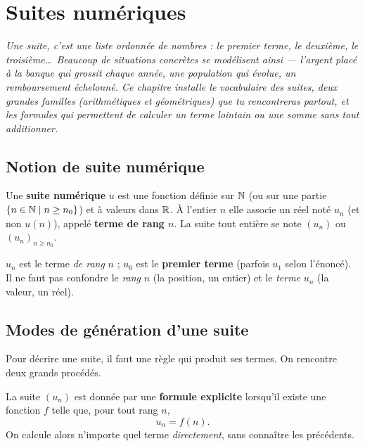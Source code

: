 \chapter{Suites numériques}
\textit{Une suite, c'est une liste \emph{ordonnée} de nombres : le premier terme,
le deuxième, le troisième\dots\ Beaucoup de situations concrètes se modélisent ainsi
— l'argent placé à la banque qui grossit chaque année, une population qui évolue, un
remboursement échelonné. Ce chapitre installe le vocabulaire des suites, deux grandes
familles (arithmétiques et géométriques) que tu rencontreras partout, et les formules
qui permettent de calculer un terme lointain ou une somme sans tout additionner.}

\section{Notion de suite numérique}

\begin{definition}
Une \textbf{suite numérique} $u$ est une fonction définie sur $\mathbb{N}$ (ou sur une partie
$\{n\in\mathbb{N} \mid n\ge n_0\}$) et à valeurs dans $\mathbb{R}$. À l'entier $n$ elle associe un réel
noté $u_n$ (et non $u(n)$), appelé \textbf{terme de rang $n$}. La suite tout entière se
note $(u_n)$ ou $(u_n)_{n\ge n_0}$.
\end{definition}

\begin{remarque}
$u_n$ est le terme \emph{de rang} $n$ ; $u_0$ est le \textbf{premier terme} (parfois
$u_1$ selon l'énoncé). Il ne faut pas confondre le \emph{rang} $n$ (la position, un
entier) et le \emph{terme} $u_n$ (la valeur, un réel).
\end{remarque}

\section{Modes de génération d'une suite}

Pour décrire une suite, il faut une règle qui produit ses termes. On rencontre deux
grands procédés.

\begin{definition}
La suite $(u_n)$ est donnée par une \textbf{formule explicite} lorsqu'il existe une
fonction $f$ telle que, pour tout rang $n$,
\[ u_n = f(n). \]
On calcule alors n'importe quel terme \emph{directement}, sans connaître les précédents.
\end{definition}

